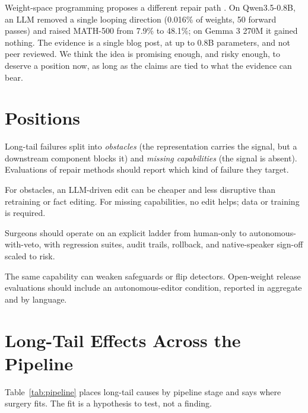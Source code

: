 \documentclass[11pt]{article}
\begin{document}
Weight-space programming proposes a different repair path \citep{takehi2026weightspace}. On Qwen3.5-0.8B, an LLM removed a single looping direction (0.016\% of weights, 50 forward passes) and raised MATH-500 from 7.9\% to 48.1\%; on Gemma 3 270M it gained nothing. The evidence is a single blog post, at up to 0.8B parameters, and not peer reviewed. We think the idea is promising enough, and risky enough, to deserve a position now, as long as the claims are tied to what the evidence can bear.

\section{Positions}
\label{sec:positions}
\begin{description}\itemsep2pt
\item[P1: Diagnose before you repair.] Long-tail failures split into \emph{obstacles} (the representation carries the signal, but a downstream component blocks it) and \emph{missing capabilities} (the signal is absent). Evaluations of repair methods should report which kind of failure they target.
\item[P2: Surgery is for obstacles.] For obstacles, an LLM-driven edit can be cheaper and less disruptive than retraining or fact editing. For missing capabilities, no edit helps; data or training is required.
\item[P3: Grade the autonomy.] Surgeons should operate on an explicit ladder from human-only to autonomous-with-veto, with regression suites, audit trails, rollback, and native-speaker sign-off scaled to risk.
\item[P4: Evaluate the misuse side.] The same capability can weaken safeguards or flip detectors. Open-weight release evaluations should include an autonomous-editor condition, reported in aggregate and by language.
\end{description}

\section{Long-Tail Effects Across the Pipeline}
\label{sec:pipeline}
Table~\ref{tab:pipeline} places long-tail causes by pipeline stage and says where surgery fits. The fit is a hypothesis to test, not a finding.
\end{document}
